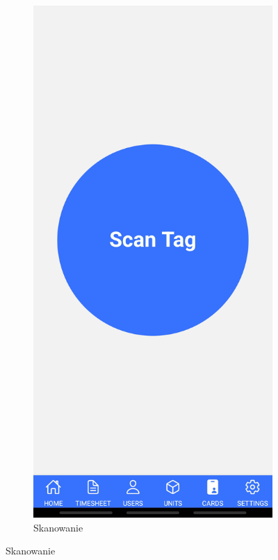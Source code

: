 \begin{figure}[H]
\begin{subfigure}[b]{0.3\textwidth}
        \includegraphics[width=\textwidth, frame]{graf/mobile/cardView.jpg}
        \caption{Skanowanie}

\end{subfigure}
\end{figure}
